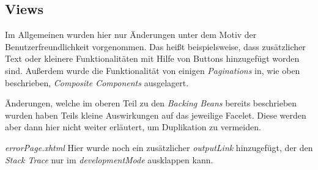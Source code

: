 \subsection{Views}

Im Allgemeinen wurden hier nur Änderungen unter dem Motiv der Benutzerfreundlichkeit vorgenommen. Das heißt beispielsweise, dass zusätzlicher Text oder kleinere Funktionalitäten mit Hilfe von Buttons hinzugefügt worden sind. Außerdem wurde die Funktionalität von einigen \emph{Paginations} in, wie oben beschrieben, \emph{Composite Components} ausgelagert.

Änderungen, welche im oberen Teil zu den \emph{Backing Beans} bereits beschrieben wurden haben Teils kleine Auswirkungen auf das jeweilige Facelet. Diese werden aber dann hier nicht weiter erläutert, um Duplikation zu vermeiden.

\emph{errorPage.xhtml} Hier wurde noch ein zusätzlicher \emph{outputLink} hinzugefügt, der den \emph{Stack Trace} nur im \emph{developmentMode} ausklappen kann.
